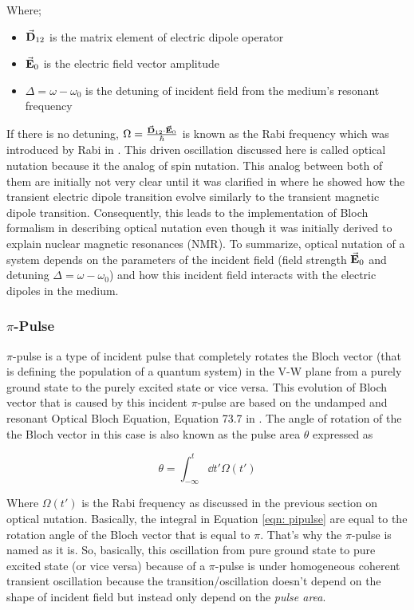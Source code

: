 Where;

\begin{itemize}
    \item $\va{D}_{12}$ is the matrix element of electric dipole operator
    \item $\va{E}_{0}$ is the electric field vector amplitude
    \item $\Delta = \omega - \omega_{0}$ is the detuning of incident field from the medium's resonant frequency
\end{itemize}

If there is no detuning, $\Omega = \frac{\va{D}_{12} \cdot \va{E}_{0}}{\hbar}$ is known as the Rabi frequency which was introduced by Rabi in \cite{Rabi1937}. This driven oscillation discussed here is called optical nutation because it the analog of spin nutation. This analog between both of them are initially not very clear until it was clarified in \cite{Dicke1954} where he showed how the transient electric dipole transition evolve similarly to the transient magnetic dipole transition. Consequently, this leads to the implementation of Bloch formalism in describing optical nutation even though it was initially derived to explain nuclear magnetic resonances (NMR). To summarize, optical nutation of a system depends on the parameters of the incident field (field strength $\va{E}_{0}$ and detuning $\Delta = \omega - \omega_{0}$) and how this incident field interacts with the electric dipoles in the medium.

\subsubsection{$\pi$-Pulse}
$\pi$-pulse is a type of incident pulse that completely rotates the Bloch vector (that is defining the population of a quantum system) in the V-W plane from a purely ground state to the purely excited state or vice versa. This evolution of Bloch vector that is caused by this incident $\pi$-pulse are based on the undamped and resonant Optical Bloch Equation, Equation 73.7 in \cite{Meystre2006}. The angle of rotation of the the Bloch vector in this case is also known as the pulse area $\theta$ expressed as

\begin{equation}
    \theta = \int_{-\infty}^{t} \dd{t'} \Omega(t')
    \label{eqn: pipulse}
\end{equation}

Where $\Omega(t')$ is the Rabi frequency as discussed in the previous section on optical nutation. Basically, the integral in Equation \ref{eqn: pipulse} are equal to the rotation angle of the Bloch vector that is equal to $\pi$. That's why the $\pi$-pulse is named as it is. So, basically, this oscillation from pure ground state to pure excited state (or vice versa) because of a $\pi$-pulse is under homogeneous coherent transient oscillation because the transition/oscillation doesn't depend on the shape of incident field but instead only depend on the \textit{pulse area}.

